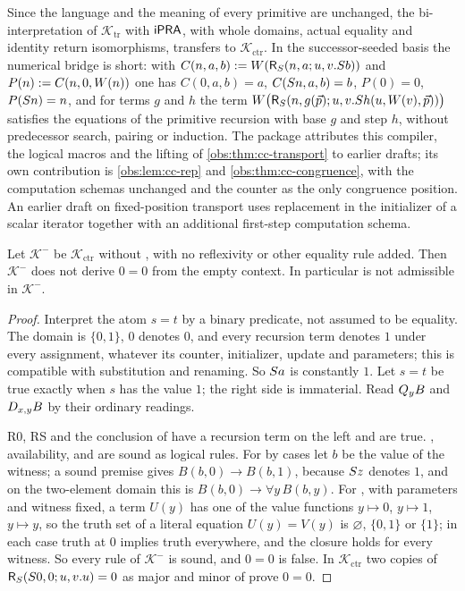Since the language and the meaning of every primitive are unchanged, the
bi-interpretation of $\mathcal{K}_{\mathrm{tr}}$ with $\mathsf{iPRA}$, with whole
domains, actual equality and identity return isomorphisms, transfers to
$\mathcal{K}_{\mathrm{ctr}}$. In the successor-seeded basis the numerical
bridge is short: with $C(n,a,b)\mathrel{:=} W(\mathsf{R}_{S}(n,a;u,v.S b))$
and $P(n)\mathrel{:=} C(n,0,W(n))$ one has $C(0,a,b)=a$, $C(S n,a,b)=b$,
$P(0)=0$, $P(S n)=n$, and for terms $g$ and $h$ the term
$W\bigl(\mathsf{R}_{S}(n,g(\vec p);u,v.S h(u,W(v),\vec p))\bigr)$
satisfies the equations of the primitive recursion with base $g$ and step $h$,
without predecessor search, pairing or induction. The package attributes this
compiler, the logical macros and the lifting of \cref{obs:thm:cc-transport} to
earlier drafts; its own contribution is \cref{obs:lem:cc-rep} and
\cref{obs:thm:cc-congruence}, with the computation schemas unchanged and the
counter as the only congruence position. An earlier draft on fixed-position
transport uses replacement in the initializer of a scalar iterator together
with an additional first-step computation schema.

\begin{theorem}
\label{obs:thm:RL-independent}
Let $\mathcal{K}^{-}$ be $\mathcal{K}_{\mathrm{ctr}}$ without ,
with no reflexivity or other equality rule added. Then $\mathcal{K}^{-}$ does
not derive $0=0$ from the empty context. In particular  is not
admissible in $\mathcal{K}^{-}$.
\end{theorem}

\begin{proof}
Interpret the atom $s=t$ by a binary predicate, not assumed to be equality.
The domain is $\{0,1\}$, $0$ denotes $0$, and every recursion term denotes $1$
under every assignment, whatever its counter, initializer, update and
parameters; this is compatible with substitution and renaming. So $S a$ is
constantly $1$. Let $s=t$ be true exactly when $s$ has the value $1$; the right
side is immaterial. Read $Q_{y}B$ and $D_{x,y}B$ by their ordinary readings.

R0, RS and the conclusion of  have a recursion term on the left
and are true. , availability,  and 
are sound as logical rules. For  by cases let $b$ be the value of
the witness; a sound premise gives $B(b,0)\to B(b,1)$, because $S z$ denotes
$1$, and on the two-element domain this is $B(b,0)\to\forall y\,B(b,y)$. For
, with parameters and witness fixed, a term $U(y)$ has
one of the value functions $y\mapsto 0$, $y\mapsto 1$, $y\mapsto y$, so the
truth set of a literal equation $U(y)=V(y)$ is $\varnothing$, $\{0,1\}$ or
$\{1\}$; in each case truth at $0$ implies truth everywhere, and the closure
holds for every witness. So every rule of $\mathcal{K}^{-}$ is sound, and
$0=0$ is false. In $\mathcal{K}_{\mathrm{ctr}}$ two copies of
$\mathsf{R}_{S}(S 0,0;u,v.u)=0$ as major and minor of  prove
$0=0$.
\end{proof}

